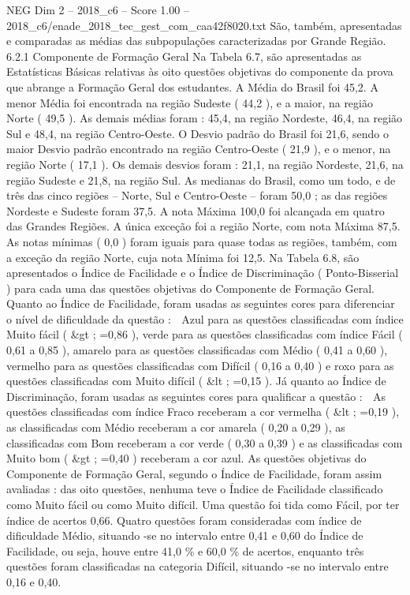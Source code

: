 \begin{textsample}{NEG Dim 2 – 2018\_c6 – Score 1.00 – 2018\_c6/enade\_2018\_tec\_gest\_com\_caa42f8020.txt}
São, também, apresentadas e comparadas as médias das subpopulações caracterizadas por Grande Região. 6.2.1 Componente de Formação Geral Na Tabela 6.7, são apresentadas as Estatísticas Básicas relativas às oito questões objetivas do componente da prova que abrange a Formação Geral dos estudantes.
A Média do Brasil foi 45,2.
A menor Média foi encontrada na região Sudeste ( 44,2 ), e a maior, na região Norte ( 49,5 ).
As demais médias foram : 45,4, na região Nordeste, 46,4, na região Sul e 48,4, na região Centro-Oeste.
O Desvio padrão do Brasil foi 21,6, sendo o maior Desvio padrão encontrado na região Centro-Oeste ( 21,9 ), e o menor, na região Norte ( 17,1 ).
Os demais desvios foram : 21,1, na região Nordeste, 21,6, na região Sudeste e 21,8, na região Sul.
As medianas do Brasil, como um todo, e de três das cinco regiões – Norte, Sul e Centro-Oeste – foram 50,0 ; as das regiões Nordeste e Sudeste foram 37,5.
A nota Máxima 100,0 foi alcançada em quatro das Grandes Regiões.
A única exceção foi a região Norte, com nota Máxima 87,5.
As notas mínimas ( 0,0 ) foram iguais para quase todas as regiões, também, com a exceção da região Norte, cuja nota Mínima foi 12,5.
Na Tabela 6.8, são apresentados o Índice de Facilidade e o Índice de Discriminação ( Ponto-Bisserial ) para cada uma das questões objetivas do Componente de Formação Geral.
Quanto ao Índice de Facilidade, foram usadas as seguintes cores para diferenciar o nível de dificuldade da questão :  Azul para as questões classificadas com índice Muito fácil ( \&gt ; =0,86 ), verde para as questões classificadas com índice Fácil ( 0,61 a 0,85 ), amarelo para as questões classificadas com Médio ( 0,41 a 0,60 ), vermelho para as questões classificadas com Difícil ( 0,16 a 0,40 ) e roxo para as questões classificadas com Muito difícil ( \&lt ; =0,15 ).
Já quanto ao Índice de Discriminação, foram usadas as seguintes cores para qualificar a questão :  As questões classificadas com índice Fraco receberam a cor vermelha ( \&lt ; =0,19 ), as classificadas com Médio receberam a cor amarela ( 0,20 a 0,29 ), as classificadas com Bom receberam a cor verde ( 0,30 a 0,39 ) e as classificadas com Muito bom ( \&gt ; =0,40 ) receberam a cor azul.
As questões objetivas do Componente de Formação Geral, segundo o Índice de Facilidade, foram assim avaliadas : das oito questões, nenhuma teve o Índice de Facilidade classificado como Muito fácil ou como Muito difícil.
Uma questão foi tida como Fácil, por ter índice de acertos 0,66.
Quatro questões foram consideradas com índice de dificuldade Médio, situando -se no intervalo entre 0,41 e 0,60 do Índice de Facilidade, ou seja, houve entre 41,0 \% e 60,0 \% de acertos, enquanto três questões foram classificadas na categoria Difícil, situando -se no intervalo entre 0,16 e 0,40.

\end{textsample}
